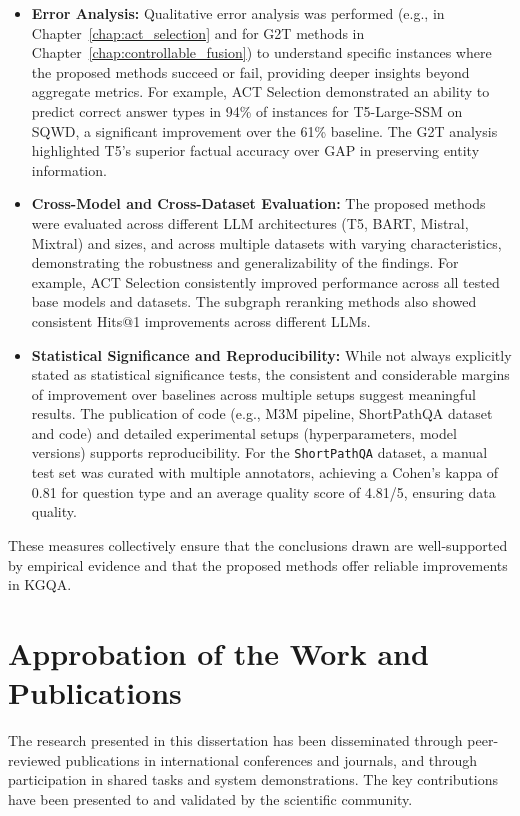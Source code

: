 \begin{itemize}
    \item \textbf{Error Analysis:} Qualitative error analysis was performed (e.g., in Chapter~\ref{chap:act_selection} and for G2T methods in Chapter~\ref{chap:controllable_fusion}) to understand specific instances where the proposed methods succeed or fail, providing deeper insights beyond aggregate metrics. For example, ACT Selection demonstrated an ability to predict correct answer types in 94\% of instances for T5-Large-SSM on SQWD, a significant improvement over the 61\% baseline. The G2T analysis highlighted T5's superior factual accuracy over GAP in preserving entity information.
    \item \textbf{Cross-Model and Cross-Dataset Evaluation:} The proposed methods were evaluated across different LLM architectures (T5, BART, Mistral, Mixtral) and sizes, and across multiple datasets with varying characteristics, demonstrating the robustness and generalizability of the findings. For example, ACT Selection consistently improved performance across all tested base models and datasets. The subgraph reranking methods also showed consistent Hits@1 improvements across different LLMs.
    \item \textbf{Statistical Significance and Reproducibility:} While not always explicitly stated as statistical significance tests, the consistent and considerable margins of improvement over baselines across multiple setups suggest meaningful results. The publication of code (e.g., M3M pipeline, ShortPathQA dataset and code) and detailed experimental setups (hyperparameters, model versions) supports reproducibility. For the \texttt{ShortPathQA} dataset, a manual test set was curated with multiple annotators, achieving a Cohen's kappa of 0.81 for question type and an average quality score of 4.81/5, ensuring data quality.
\end{itemize}
These measures collectively ensure that the conclusions drawn are well-supported by empirical evidence and that the proposed methods offer reliable improvements in KGQA.

\section{Approbation of the Work and Publications}
\label{sec:intro:approbation}
The research presented in this dissertation has been disseminated through peer-reviewed publications in international conferences and journals, and through participation in shared tasks and system demonstrations. The key contributions have been presented to and validated by the scientific community.

